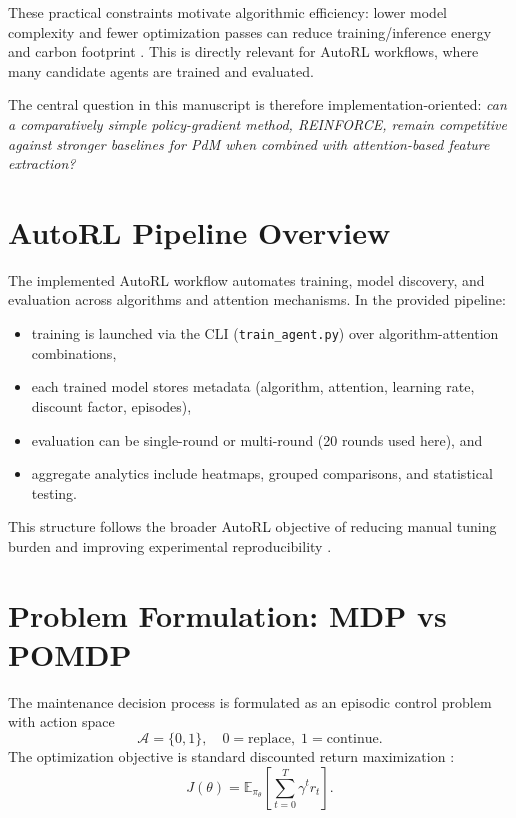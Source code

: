 \documentclass[11pt]{article}
\begin{document}
These practical constraints motivate algorithmic efficiency: lower model complexity and fewer optimization passes can reduce training/inference energy and carbon footprint \citep{Strubell2019EnergyPolicy,Patterson2021Carbon,Schwartz2020GreenAI}. This is directly relevant for AutoRL workflows, where many candidate agents are trained and evaluated.

The central question in this manuscript is therefore implementation-oriented: \emph{can a comparatively simple policy-gradient method, \textsc{REINFORCE}, remain competitive against stronger baselines for PdM when combined with attention-based feature extraction?}

\section{AutoRL Pipeline Overview}
The implemented AutoRL workflow automates training, model discovery, and evaluation across algorithms and attention mechanisms. In the provided pipeline:
\begin{itemize}
  \item training is launched via the CLI (\texttt{train\_agent.py}) over algorithm-attention combinations,
  \item each trained model stores metadata (algorithm, attention, learning rate, discount factor, episodes),
  \item evaluation can be single-round or multi-round (20 rounds used here), and
  \item aggregate analytics include heatmaps, grouped comparisons, and statistical testing.
\end{itemize}
This structure follows the broader AutoRL objective of reducing manual tuning burden and improving experimental reproducibility \citep{Faust2019EvolvingRewards,ARLO2023}.

\section{Problem Formulation: MDP vs POMDP}
The maintenance decision process is formulated as an episodic control problem with action space
\begin{equation}
\mathcal{A}=\{0,1\},\quad 0=\text{replace},\; 1=\text{continue}.
\end{equation}
The optimization objective is standard discounted return maximization \citep{SuttonBarto2018}:
\begin{equation}
J(\theta)=\mathbb{E}_{\pi_\theta}\!\left[\sum_{t=0}^{T}\gamma^t r_t\right].
\end{equation}
\end{document}
